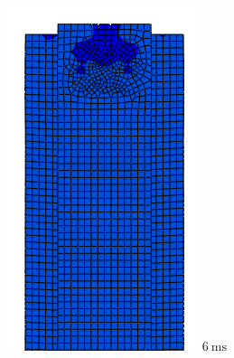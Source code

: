 \documentclass[
documentsize = a4, %
font = cmr, %
typesize = 11, %
printmode = true,
onehalfspacing = true,
language = en, %
titlepage = udciccp, %
degree = pt, %
dedication = true,
acknowledgements = true,
abstract-en = true,
abstract-es = false,
abstract-ga = false,
epigraphs = true,
toc = true,
lof = true,
lot = true,
frontmatterintoc = false,
notation = false,
minimal = false,
]{UDCthesis}
\begin{document}
\begin{figure}
\begin{minipage}[b]{.15\linewidth}
		\centering
		\includegraphics[width=\linewidth]{IMG_CUTRES/c2}
		$\SI{6}{\ms}$
	\end{minipage}
	\quad
	\begin{minipage}[b]{.15\linewidth}
		\centering

\end{minipage}
\end{figure}
\end{document}
